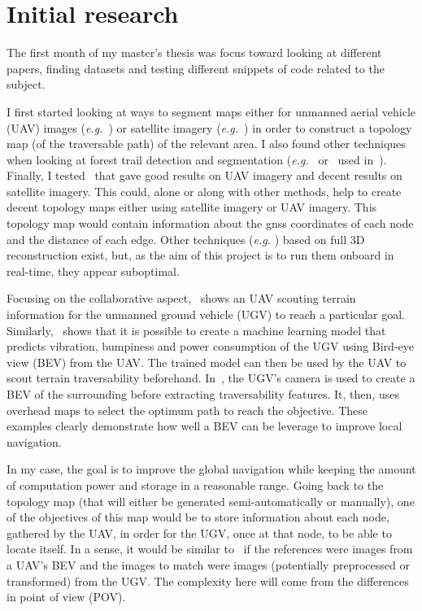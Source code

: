 \documentclass[11pt, a4paper]{article}
\begin{document}
    


    \section{Initial research}\label{sec:initial-research}

    The first month of my master's thesis was focus toward looking at different papers, finding datasets and testing
    different snippets of code related to the subject.

    I first started looking at ways to segment maps either for unmanned aerial vehicle (UAV) images (\textit{e.g.}~\cite{khan_visual_2012}) or satellite imagery
    (\textit{e.g.}~\cite{sofman_terrain_2006}) in order to construct a topology map (of the traversable path) of the relevant area.
    I also found other techniques when looking at forest trail detection and segmentation (\textit{e.g.}~\cite{giusti_machine_2016}
    or~\cite{rufus_blas_fast_2008} used in~\cite{rasmussen_appearance_2009}).
    Finally, I tested~\cite{bosch_journal_2020} that gave good results on UAV imagery and decent results on satellite imagery.
    This could, alone or along with other methods, help to create decent topology maps either using satellite imagery or UAV imagery.
    This topology map would contain information about the \gls{gnss} coordinates of each node and the distance of each edge.
    Other techniques (\textit{e.g.} \cite{wang_2d_2021}) based on full 3D reconstruction exist, but,
    as the aim of this project is to run them onboard in real-time, they appear suboptimal.

    Focusing on the collaborative aspect,~\cite{delmerico_active_2017} shows an UAV scouting terrain information for
    the unmanned ground vehicle (UGV) to reach a particular goal.
    Similarly,~\cite{fortin_uav-assisted_2024} shows that it is possible to create a machine learning model that predicts
    vibration, bumpiness and power consumption of the UGV using Bird-eye view (BEV) from the UAV.
    The trained model can then be used by the UAV to scout terrain traversability beforehand.
    In~\cite{zhang_dual-bev_2025}, the UGV's camera is used to create a BEV of the surrounding before extracting
    traversability features.
    It, then, uses overhead maps to select the optimum path to reach the objective.
    These examples clearly demonstrate how well a BEV can be leverage to improve local navigation.

    In my case, the goal is to improve the global navigation while keeping the amount of computation power and storage
    in a reasonable range.
    Going back to the topology map (that will either be generated semi-automatically or manually),
    one of the objectives of this map would be to store information about each node,
    gathered by the UAV, in order for the UGV, once at that node, to be able to locate itself.
    In a sense, it would be similar to~\cite{han_effective_2020} if the references were images from a UAV's BEV
    and the images to match were images (potentially preprocessed or transformed) from the UGV.
    The complexity here will come from the differences in point of view (POV).
\end{document}

